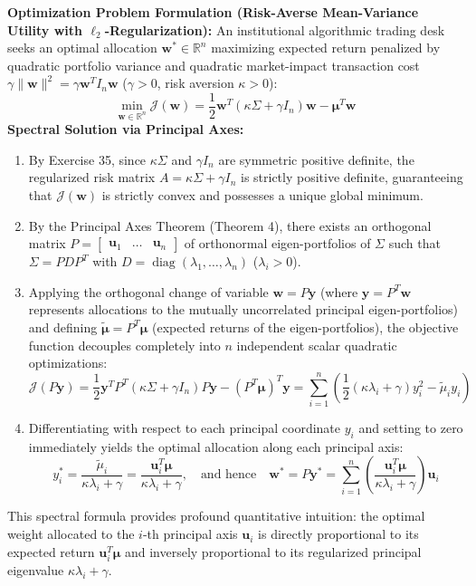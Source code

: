 \documentclass[11pt, letterpaper]{article}
\theoremstyle{definition}
\theoremstyle{remark}
\begin{document}
\textbf{Optimization Problem Formulation (Risk-Averse Mean-Variance Utility with $\ell_2$-Regularization):}
An institutional algorithmic trading desk seeks an optimal allocation $\mathbf{w}^* \in \mathbb{R}^n$ maximizing expected return penalized by quadratic portfolio variance and quadratic market-impact transaction cost $\gamma \|\mathbf{w}\|^2 = \gamma \mathbf{w}^T I_n \mathbf{w}$ ($\gamma > 0$, risk aversion $\kappa > 0$):
\[
\min_{\mathbf{w} \in \mathbb{R}^n} \mathcal{J}(\mathbf{w}) = \frac{1}{2} \mathbf{w}^T (\kappa \Sigma + \gamma I_n) \mathbf{w} - \boldsymbol{\mu}^T \mathbf{w}
\]
\textbf{Spectral Solution via Principal Axes:}
\begin{enumerate}
    \item By Exercise 35, since $\kappa \Sigma$ and $\gamma I_n$ are symmetric positive definite, the regularized risk matrix $A = \kappa \Sigma + \gamma I_n$ is strictly positive definite, guaranteeing that $\mathcal{J}(\mathbf{w})$ is strictly convex and possesses a unique global minimum.
    \item By the Principal Axes Theorem (Theorem 4), there exists an orthogonal matrix $P = \begin{bmatrix} \mathbf{u}_1 & \dots & \mathbf{u}_n \end{bmatrix}$ of orthonormal eigen-portfolios of $\Sigma$ such that $\Sigma = P D P^T$ with $D = \operatorname{diag}(\lambda_1, \dots, \lambda_n)$ ($\lambda_i > 0$).
    \item Applying the orthogonal change of variable $\mathbf{w} = P\mathbf{y}$ (where $\mathbf{y} = P^T \mathbf{w}$ represents allocations to the mutually uncorrelated principal eigen-portfolios) and defining $\tilde{\boldsymbol{\mu}} = P^T \boldsymbol{\mu}$ (expected returns of the eigen-portfolios), the objective function decouples completely into $n$ independent scalar quadratic optimizations:
    \[
    \mathcal{J}(P\mathbf{y}) = \frac{1}{2} \mathbf{y}^T P^T (\kappa \Sigma + \gamma I_n) P \mathbf{y} - (P^T \boldsymbol{\mu})^T \mathbf{y} = \sum_{i=1}^n \left( \frac{1}{2}(\kappa \lambda_i + \gamma) y_i^2 - \tilde{\mu}_i y_i \right)
    \]
    \item Differentiating with respect to each principal coordinate $y_i$ and setting to zero immediately yields the optimal allocation along each principal axis:
    \[
    y_i^* = \frac{\tilde{\mu}_i}{\kappa \lambda_i + \gamma} = \frac{\mathbf{u}_i^T \boldsymbol{\mu}}{\kappa \lambda_i + \gamma}, \quad \text{and hence} \quad \mathbf{w}^* = P\mathbf{y}^* = \sum_{i=1}^n \left( \frac{\mathbf{u}_i^T \boldsymbol{\mu}}{\kappa \lambda_i + \gamma} \right) \mathbf{u}_i
    \]
\end{enumerate}
This spectral formula provides profound quantitative intuition: the optimal weight allocated to the $i$-th principal axis $\mathbf{u}_i$ is directly proportional to its expected return $\mathbf{u}_i^T \boldsymbol{\mu}$ and inversely proportional to its regularized principal eigenvalue $\kappa \lambda_i + \gamma$.
\end{document}
